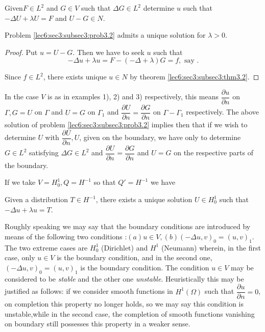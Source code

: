 \begin{problem}\label{lec6:sec3:subsec3:prob3.2}%
  Given\pageoriginale $F \in L^2$ and $G \in V$ such that $\Delta G
  \in L^2$ determine $u$ such that $- \Delta U + \lambda U = F $
  and $U - G \in N$. 
\end{problem}

\begin{theorem}\label{lec6:sec3:subsec3:thm3.3}%
  Problem \ref{lec6:sec3:subsec3:prob3.2} admits a unique solution for $\lambda > 0$.
\end{theorem}

\begin{proof}%
  Put $u = U-G$. Then we have to seek $u$ such that
  $$
  - \Delta u + \lambda u = F - (- \Delta + \lambda) G = f, \text{ say }.
  $$
  
  Since $f \in L^2$, there exists unique $u \in N$ by
theorem \ref{lec6:sec3:subsec3:thm3.2}. 
\end{proof}

In the case $V$ is as in examples 1), 2) and 3) respectively, this
means $\dfrac{\partial u}{\partial n}$ on $\Gamma, G = U$ on $\Gamma$
and $U = G$ on $\Gamma_1$ and $\dfrac{\partial U}{\partial n} =
\dfrac{\partial G}{\partial n}$ on $\Gamma - \Gamma_1$ respectively. The
above solution of problem \ref{lec6:sec3:subsec3:prob3.2} implies then that if we wish to
determine $U$ with $\dfrac{\partial U}{\partial n}, U$, given on the
boundary, we have only to determine $G \in L^2$ satisfying
$\Delta G \in L^2$ and $\dfrac{\partial U}{\partial n} =
\dfrac{\partial G}{\partial n}$ and $U = G$ on the respective parts of
the boundary.
 
\begin{remark*}
  If we take $V= H^1_0, Q = H^{-1}$ so that  $Q' = H^{-1}$ we have
\end{remark*}

\begin{theorem}\label{lec6:sec3:subsec3:thm3.4}%
  Given a distribution $T \in H^{-1}$, there exists a unique
  solution $U \in H^1_0$ such that $-\Delta u + \lambda u = T$. 
\end{theorem}

\begin{remark*}
  Roughly speaking we may say that the boundary conditions are
  introduced by means of the following two conditions :$(a) u
  \in V, (b) (- \Delta u, v)_0 = (u, v)_1$. The two extreme
  cases are $H^1_0$ (Dirichlet) and $H^1$ (Neumann) wherein, in the
  first case, only $u \in V$ is the boundary condition, and in
  the second one, $(- \Delta u, v)_0 = (u, v)_1$ is the boundary
  condition. The condition $u \in V$ may be considered to be
  \textit{stable} and the  other one \textit{unstable}. Heuristically
  this may be justified as follows: if we consider smooth functions in
  $H^1(\Omega) $ such that $\dfrac{\partial u}{\partial n}= 0$, on
  completion this property no longer holds, so we may say this condition
  is unstable,\pageoriginale while in the second case, the completion of smooth
  functions vanishing on boundary still possesses this property in a
  weaker sense.   
\end{remark*}

